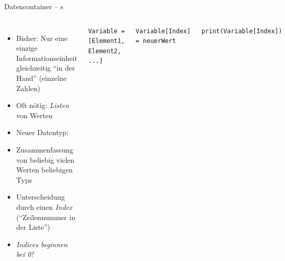 
\begin{frame}[fragile]{Datencontainer -- s}
%
\begin{columns}
\begin{itemize}
\item Bisher: Nur eine einzige Informationseinheit gleichzeitig \enquote{in der Hand} (einzelne Zahlen)
\item Oft nötig: \emph{Listen} von Werten
\item Neuer Datentyp: 
\item Zusammenfassung von beliebig vielen Werten beliebigen Typs
\item Unterscheidung durch einen \emph{Index} (\enquote{Zeilennummer in der Liste})
\item \emph{Indices beginnen bei 0!}
\end{itemize}
%
\begin{codebox}
\begin{verbatim}
Variable = [Element1, Element2, ...]
\end{verbatim}
\end{codebox}
%
\begin{codebox}
\begin{verbatim}
Variable[Index] = neuerWert
\end{verbatim}
\end{codebox}
%
\begin{codebox}
\begin{verbatim}
print(Variable[Index])
\end{verbatim}
\end{codebox}
\end{columns}
%
\end{frame}


